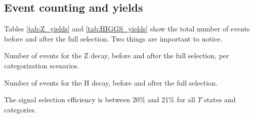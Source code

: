 \subsection{Event counting and yields}
\label{sec:yields}

Tables \ref{tab:Z_yields} and \ref{tab:HIGGS_yields} show the total number of events before and after the full selection. Two things are important to notice.

\begin{table}[ht]
\begin{center}
  \caption{Number of events for the Z decay, before and after the full selection, per categorization scenarios.}


\label{tab:Z_yields}
\end{center}
\end{table}


\begin{table}[ht]
\caption{Number of events for the H decay, before and after the full selection.}
\begin{center}


\label{tab:HIGGS_yields}
\end{center}
\end{table}


The signal selection efficiency is between 20\% and 21\% for all $\Upsilon$ states and categories. 

